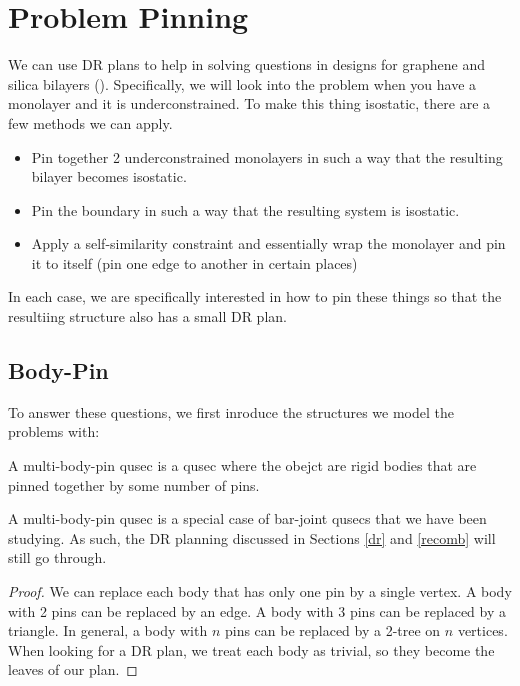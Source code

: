 \section{Problem Pinning}

We can use DR plans to help in solving questions in designs for graphene and silica bilayers (). Specifically, we will look into the problem when you have a monolayer and it is underconstrained. To make this thing isostatic, there are a few methods we can apply.

\begin{itemize}
    \item Pin together 2 underconstrained monolayers in such a way that the resulting bilayer becomes isostatic.
    \item Pin the boundary in such a way that the resulting system is isostatic.
    \item Apply a self-similarity constraint and essentially wrap the monolayer and pin it to itself (pin one edge to another in certain places)
\end{itemize}

In each case, we are specifically interested in how to pin these things so that the resultiing structure also has a small DR plan.

\subsection{Body-Pin}

To answer these questions, we first inroduce the structures we model the problems with:

\begin{definition}
    A multi-body-pin qusec is a qusec where the obejct are rigid bodies that are pinned together by some number of pins.
\end{definition}

\begin{remark}
    A multi-body-pin qusec is a special case of bar-joint qusecs that we have been studying. As such, the DR planning discussed in Sections \ref{dr} and \ref{recomb} will still go through.
\end{remark}

\begin{proof}
    We can replace each body that has only one pin by a single vertex. A body with 2 pins can be replaced by an edge. A body with 3 pins can be replaced by a triangle. In general, a body with $n$ pins can be replaced by a 2-tree on $n$ vertices. When looking for a DR plan, we treat each body as trivial, so they become the leaves of our plan.
\end{proof}

